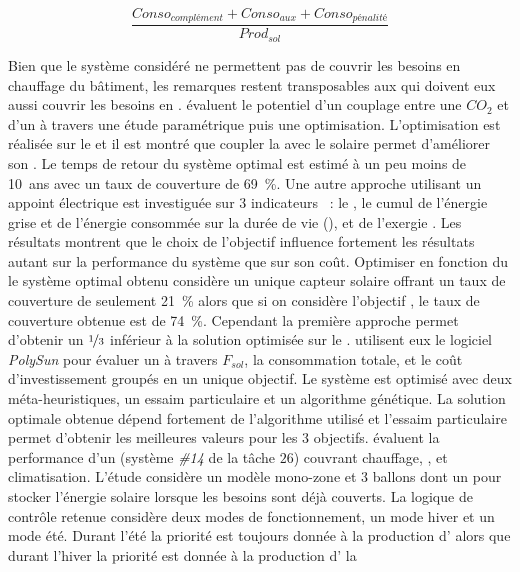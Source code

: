 \begin{equation}\label{eq:qmin_qsol}
    \frac{Conso_{complément} + Conso_{aux} + Conso_{pénalité}}{Prod_{sol}}
\end{equation}

Bien que le système considéré ne permettent pas de couvrir les besoins en chauffage du
bâtiment, les remarques restent transposables aux  qui doivent eux aussi
couvrir les besoins en .
\textcite{Deng2013212} évaluent le potentiel d’un couplage entre une  $CO_{2}$ et
d’un  à travers une étude paramétrique puis une optimisation. L’optimisation est
réalisée sur le  et il est montré que coupler la  avec le
solaire permet d’améliorer son . Le temps de retour du système optimal est estimé
à un peu moins de \SI{10}{ans} avec un taux de couverture de \SI{69}{\percent}. Une autre
approche utilisant un appoint électrique est investiguée sur $3$ indicateurs
\parencite{Hin2012,Hin2014102}~:
le , le cumul de l’énergie grise et de l’énergie consommée sur la durée de vie
(), et de l’exergie . Les résultats montrent que le choix de l’objectif
influence fortement les résultats autant sur la performance du système que sur son coût.
Optimiser en fonction du  le système optimal obtenu considère un unique capteur
solaire offrant un taux de couverture de seulement \SI{21}{\percent} alors que si on
considère l’objectif , le taux de couverture obtenue est de \SI{74}{\percent}.
Cependant la première approche permet d’obtenir un  $\nicefrac{1}{3}$ inférieur à
la solution optimisée sur le . \textcite{Bornatico201231} utilisent eux le
logiciel \textit{PolySun} pour évaluer un  à travers $F_{sol}$, la
consommation totale, et le coût d’investissement groupés en un unique objectif. Le
système est optimisé avec deux méta-heuristiques, un essaim particulaire et un algorithme
génétique. La solution optimale obtenue dépend fortement de l’algorithme utilisé et
l’essaim particulaire permet d’obtenir les meilleures valeurs pour les $3$ objectifs.
\textcite{Asaee2014510} évaluent la performance d’un  (système \emph{\#14} de la tâche
$26$) couvrant chauffage, , et climatisation. L’étude considère un modèle
mono-zone et $3$ ballons dont un pour stocker l’énergie solaire lorsque les besoins sont déjà
couverts. La logique de contrôle retenue considère deux modes de fonctionnement, un mode
hiver et un mode été. Durant l’été la priorité est toujours donnée à la production
d’ alors que durant l’hiver la priorité est donnée à la production d’ la
